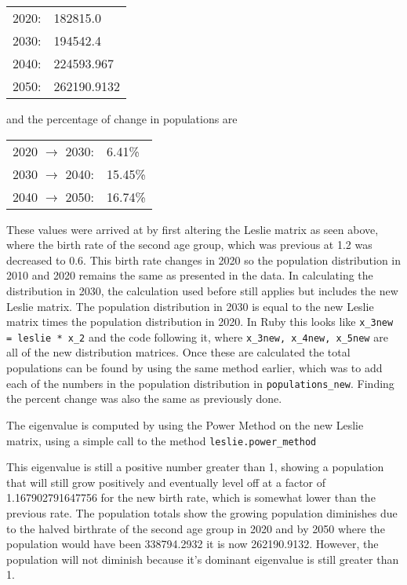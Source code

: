 \documentclass[letterpaper,12pt]{article}
\begin{document}
\vspace{11pt}

\begin{tabular}{l l}
2020: & 182815.0 \\
2030: & 194542.4 \\
2040: & 224593.967 \\
2050: & 262190.9132
\end{tabular}

\vspace{11pt}

and the percentage of change in populations are

\vspace{11pt}

\begin{tabular}{l l}
2020 $\to$ 2030: & 6.41\% \\
2030 $\to$ 2040: & 15.45\% \\
2040 $\to$ 2050: & 16.74\%
\end{tabular}

\vspace{11pt}

These values were arrived at by first altering the Leslie matrix as seen above, where
the birth rate of the second age group, which was previous at 1.2 was decreased to 0.6.
This birth rate changes in 2020 so the population distribution in 2010 and 2020 remains the same as
presented in the data.
In calculating the distribution in 2030, the calculation used before still applies but includes the
new Leslie matrix.
The population distribution in 2030 is equal to the new Leslie matrix times the population
distribution in 2020.
In Ruby this looks like \texttt{x\_3new = leslie * x\_2} and the code following it,
where \texttt{x\_3new, x\_4new, x\_5new} are all of the new distribution matrices.
Once these are calculated the total populations can be found by using the same method earlier,
which was to add each of the numbers in the population distribution in \texttt{populations\_new}.
Finding the percent change was also the same as previously done. 

The eigenvalue is computed by using the Power Method on the new Leslie matrix, using a simple call to the method \texttt{leslie.power\_method}

This eigenvalue is still a positive number greater than 1, showing a population that will still grow positively and eventually
level off at a factor of 1.167902791647756 for the new birth rate, which is somewhat lower than the previous rate.
The population totals show the growing population diminishes due to the halved birthrate of the second age group in 2020 and by
2050 where the population would have been 338794.2932 it is now 262190.9132.
However, the population will not diminish because it's dominant eigenvalue is still greater than 1.
\end{document}
